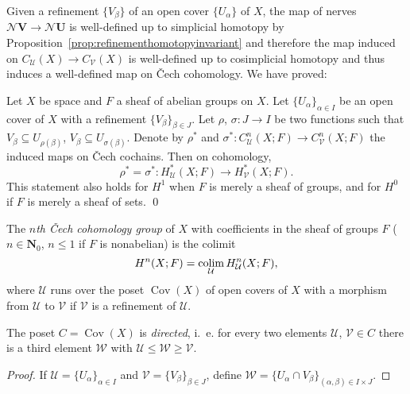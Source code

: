 \documentclass[a4paper,openany]{scrbook}
\DeclareMathOperator{\Cov}{Cov}
\newcommand{\nerve}{\mathcal N}
\begin{document}
Given a refinement $\{V_\beta\}$ of an open cover $\{U_\alpha\}$ of $X$, the map of nerves $\nerve \mathbf V \to \nerve \mathbf U$ is well-defined up to simplicial homotopy by Proposition~\ref{prop:refinementhomotopyinvariant} and therefore the map induced on $C_{\mathcal U}(X) \to C_{\mathcal V}(X)$ is well-defined up to cosimplicial homotopy and thus induces a well-defined map on Čech cohomology. We have proved:

\begin{thm}\label{thm:welldefinedrefinement}
Let $X$ be space and $F$ a sheaf of abelian groups on $X$.
Let $\{U_\alpha\}_{\alpha \in I}$ be an open cover of $X$ with a refinement $\{V_\beta\}_{\beta \in J}$. Let $\rho$, $\sigma\colon J \to I$ be two functions such that $V_{\beta} \subseteq U_{\rho(\beta)}$, $V_\beta \subseteq U_{\sigma(\beta)}$. Denote by $\rho^*$ and $\sigma^*\colon C^n_{\mathcal U}(X;F) \to C^n_{\mathcal V}(X;F)$ the induced maps on Čech cochains. Then on cohomology,
\[
\rho^* = \sigma^*\colon H^*_{\mathcal U}(X;F) \to H^*_{\mathcal V}(X;F).
\]
This statement also holds for $H^1$ when $F$ is merely a sheaf of groups, and for $H^0$ if $F$ is merely a sheaf of sets.
\qed
\end{thm}

\begin{defn}
The \emph{$n$th Čech cohomology group} of $X$ with coefficients in the sheaf of groups $F$ ($n \in \mathbf N_0$, $n \leq 1$ if $F$ is nonabelian) is the colimit
\[
H^n(X;F) = \operatorname*{colim}_{\mathcal U} H^n_{\mathcal U}(X;F),
\]
where $\mathcal U$ runs over the poset $\Cov(X)$ of open covers of $X$ with a morphism from $\mathcal U$ to $\mathcal V$ if $\mathcal V$ is a refinement of $\mathcal U$.
\end{defn}


\begin{lemma}
The poset $C = \Cov(X)$ is \emph{directed}, i.~e. for every two elements $\mathcal U$, $\mathcal V \in C$ there is a third element $\mathcal W$ with $\mathcal U \leq \mathcal W \geq \mathcal V$.
\end{lemma}
\begin{proof}
If $\mathcal U = \{U_\alpha\}_{\alpha \in I}$ and $\mathcal V = \{V_\beta\}_{\beta \in J}$, define $\mathcal W = \{U_\alpha \cap V_\beta\}_{(\alpha,\beta) \in I \times J}$.
\end{proof}
\end{document}
